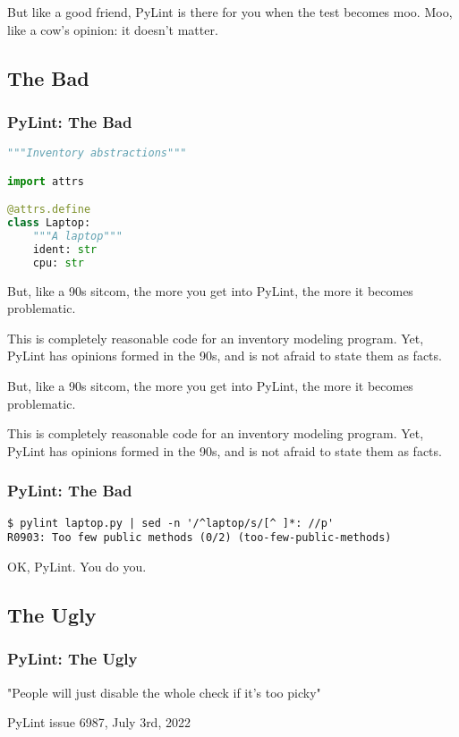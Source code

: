 But like a good friend, PyLint is there for you when the test becomes
moo. Moo, like a cow's opinion: it doesn't matter.

\hypertarget{the-bad}{%
\subsection{The Bad}\label{the-bad}}

\begin{frame}[fragile]
\frametitle{PyLint: The Bad}

\begin{lstlisting}[language=Python]
"""Inventory abstractions"""

import attrs

@attrs.define
class Laptop:
    """A laptop"""
    ident: str
    cpu: str
\end{lstlisting}

\end{frame}

But, like a 90s sitcom, the more you get into PyLint, the more it
becomes problematic.

This is completely reasonable code for an inventory modeling program.
Yet, PyLint has opinions formed in the 90s, and is not afraid to state
them as facts.

But, like a 90s sitcom, the more you get into PyLint, the more it
becomes problematic.

This is completely reasonable code for an inventory modeling program.
Yet, PyLint has opinions formed in the 90s, and is not afraid to state
them as facts.

\begin{frame}[fragile]
\frametitle{PyLint: The Bad}

\begin{lstlisting}
$ pylint laptop.py | sed -n '/^laptop/s/[^ ]*: //p'
R0903: Too few public methods (0/2) (too-few-public-methods)
\end{lstlisting}

\end{frame}

OK, PyLint. You do you.

\hypertarget{the-ugly}{%
\subsection{The Ugly}\label{the-ugly}}

\begin{frame}[fragile]
\frametitle{PyLint: The Ugly}

"People will just disable the whole check if it's too picky"

PyLint issue 6987, July 3rd, 2022

\end{frame}

